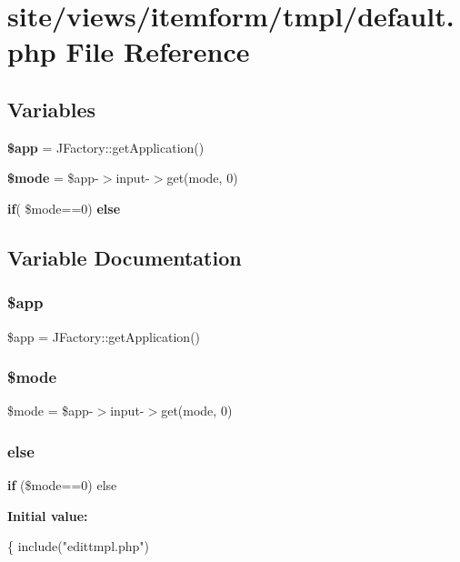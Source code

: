 \section{site/views/itemform/tmpl/default.php File Reference}
\label{site_2views_2itemform_2tmpl_2default_8php}
\subsection*{Variables}
\begin{DoxyCompactItemize}
\item 
\textbf{ \$app} = J\+Factory\+::get\+Application()
\item 
\textbf{ \$mode} = \$app-\/$>$input-\/$>$get(\textquotesingle{}mode\textquotesingle{}, 0)
\item 
\textbf{ if}( \$mode==0) \textbf{ else}
\end{DoxyCompactItemize}


\subsection{Variable Documentation}
\mbox{\label{site_2views_2itemform_2tmpl_2default_8php_adfb117f244076aa9bc269269f7e57403}} 
\subsubsection{\$app}
{\footnotesize\ttfamily \$app = J\+Factory\+::get\+Application()}

\mbox{\label{site_2views_2itemform_2tmpl_2default_8php_a3aaf40baac36e278c7d7c9139df1750c}} 
\subsubsection{\$mode}
{\footnotesize\ttfamily \$mode = \$app-\/$>$input-\/$>$get(\textquotesingle{}mode\textquotesingle{}, 0)}

\mbox{\label{site_2views_2itemform_2tmpl_2default_8php_a1fa793db651e4e77fab60465d256c0b4}} 
\subsubsection{else}
{\footnotesize\ttfamily \textbf{ if} (\$mode==0) else}

{\bfseries Initial value\+:}
\begin{DoxyCode}
\{
    include(\textcolor{stringliteral}{"edittmpl.php"})
\end{DoxyCode}
